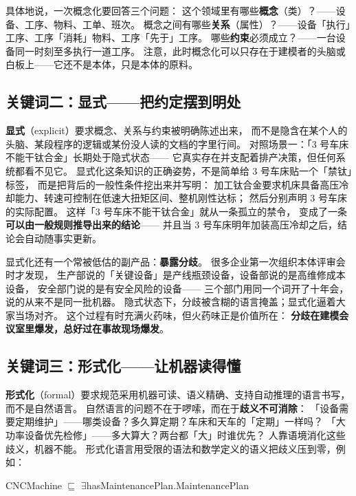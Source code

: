 具体地说，一次概念化要回答三个问题：
这个领域里有哪些\textbf{概念}（类）？——设备、工序、物料、工单、班次。
概念之间有哪些\textbf{关系}（属性）？——设备「执行」工序、工序「消耗」物料、工序「先于」工序。
哪些\textbf{约束}必须成立？——一台设备同一时刻至多执行一道工序。
注意，此时概念化可以只存在于建模者的头脑或白板上——它还不是本体，只是本体的原料。

\subsection{关键词二：显式——把约定摆到明处}

\textbf{显式}（explicit）要求概念、关系与约束被明确陈述出来，
而不是隐含在某个人的头脑、某段程序的逻辑或某份没人读的文档的字里行间。
对照场景一：「3 号车床不能干钛合金」长期处于隐式状态——
它真实存在并支配着排产决策，但任何系统都看不见它。
显式化这条知识的正确姿势，不是简单给 3 号车床贴一个「禁钛」标签，
而是把背后的一般性条件挖出来并写明：
加工钛合金要求机床具备高压冷却能力、转速可控制在低速大扭矩区间、整机刚性达标；
然后分别声明 3 号车床的实际配置。
这样「3 号车床不能干钛合金」就从一条孤立的禁令，
变成了一条\textbf{可以由一般规则推导出来的结论}——
并且当 3 号车床明年加装高压冷却之后，结论会自动随事实更新。

显式化还有一个常被低估的副产品：\textbf{暴露分歧}。
很多企业第一次组织本体评审会时才发现，
生产部说的「关键设备」是产线瓶颈设备，设备部说的是高维修成本设备，
安全部门说的是有安全风险的设备——
三个部门用同一个词开了十年会，说的从来不是同一批机器。
隐式状态下，分歧被含糊的语言掩盖；显式化逼着大家当场对齐。
这个过程有时充满火药味，但火药味正是价值所在：
\textbf{分歧在建模会议室里爆发，总好过在事故现场爆发}。

\subsection{关键词三：形式化——让机器读得懂}

\textbf{形式化}（formal）要求规范采用机器可读、语义精确、支持自动推理的语言书写，
而不是自然语言。
自然语言的问题不在于啰嗦，而在于\textbf{歧义不可消除}：
「设备需要定期维护」——哪类设备？多久算定期？车床和天车的「定期」一样吗？
「大功率设备优先检修」——多大算大？两台都「大」时谁优先？
人靠语境消化这些歧义，机器不能。
形式化语言用受限的语法和数学定义的语义把歧义压到零，例如：

\begin{noteblock}
\centering
CNCMachine \(\sqsubseteq\) \(\exists\)hasMaintenancePlan.MaintenancePlan
\end{noteblock}

